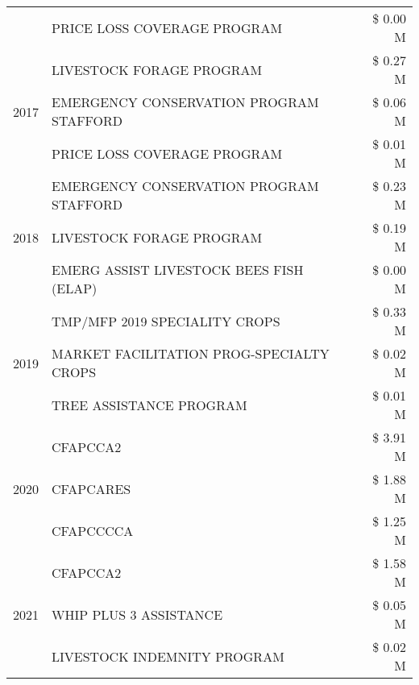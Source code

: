 \begin{tabular}{llr}
 & PRICE LOSS COVERAGE PROGRAM                   & \$ 0.00 M \\
\cline{1-3}
\multirow[t]{3}{*}{2017} & LIVESTOCK FORAGE PROGRAM & \$ 0.27 M \\
 & EMERGENCY CONSERVATION PROGRAM STAFFORD & \$ 0.06 M \\
 & PRICE LOSS COVERAGE PROGRAM & \$ 0.01 M \\
\cline{1-3}
\multirow[t]{3}{*}{2018} & EMERGENCY CONSERVATION PROGRAM STAFFORD & \$ 0.23 M \\
 & LIVESTOCK FORAGE PROGRAM & \$ 0.19 M \\
 & EMERG ASSIST LIVESTOCK BEES FISH (ELAP) & \$ 0.00 M \\
\cline{1-3}
\multirow[t]{3}{*}{2019} & TMP/MFP 2019 SPECIALITY CROPS & \$ 0.33 M \\
 & MARKET FACILITATION PROG-SPECIALTY CROPS & \$ 0.02 M \\
 & TREE ASSISTANCE PROGRAM & \$ 0.01 M \\
\cline{1-3}
\multirow[t]{3}{*}{2020} & CFAPCCA2 & \$ 3.91 M \\
 & CFAPCARES & \$ 1.88 M \\
 & CFAPCCCCA & \$ 1.25 M \\
\cline{1-3}
\multirow[t]{3}{*}{2021} & CFAPCCA2 & \$ 1.58 M \\
 & WHIP PLUS 3 ASSISTANCE & \$ 0.05 M \\
 & LIVESTOCK INDEMNITY PROGRAM & \$ 0.02 M \\
\cline{1-3}
\bottomrule
\end{tabular}
